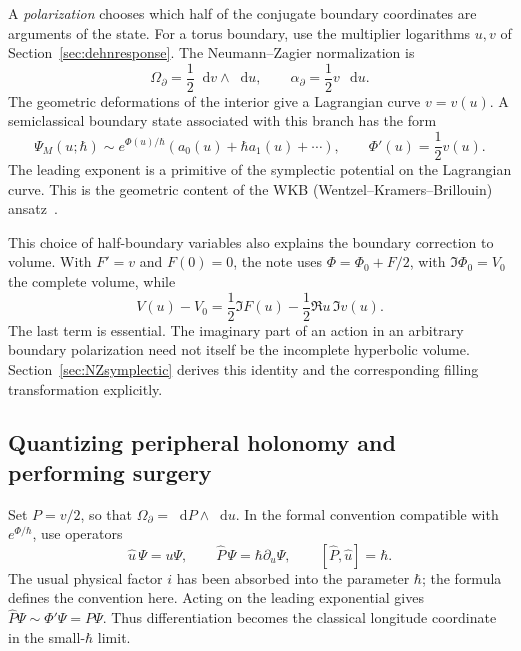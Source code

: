 \documentclass[11pt,a4paper]{article}
\numberwithin{equation}{section}
\theoremstyle{definition}
\theoremstyle{remark}
\newcommand{\dd}{\mathop{}\!\mathrm d}
\begin{document}
A \emph{polarization} chooses which half of the conjugate boundary
coordinates are arguments of the state. For a torus boundary,
use the multiplier logarithms $u,v$ of Section~\ref{sec:dehnresponse}.
The Neumann--Zagier normalization is
\begin{equation}
 \Omega_\partial=\frac12\dd v\wedge\dd u,
 \qquad \alpha_\partial=\frac12v\,\dd u.
 \label{eq:introNZpolarization}
\end{equation}
The geometric deformations of the interior give a Lagrangian curve
$v=v(u)$. A semiclassical boundary state associated with this
branch has the form
\begin{equation}
 \Psi_M(u;\hbar)\sim e^{\Phi(u)/\hbar}
       (a_0(u)+\hbar a_1(u)+\cdots),\qquad
 \Phi'(u)=\frac12v(u).
 \label{eq:introWKBstate}
\end{equation}
The leading exponent is a primitive of the symplectic potential
on the Lagrangian curve. This is the geometric content of the WKB
(Wentzel--Kramers--Brillouin) ansatz~\cite{DimofteQuantumRS}.

This choice of half-boundary variables also explains the boundary
correction to volume. With $F'=v$ and $F(0)=0$, the note uses
$\Phi=\Phi_0+F/2$, with $\Im\Phi_0=V_0$ the complete volume, while
\begin{equation}
 V(u)-V_0=\frac12\Im F(u)-\frac12\Re u\,\Im v(u).
 \label{eq:introvolumeboundary}
\end{equation}
The last term is essential. The imaginary part of an action in an
arbitrary boundary polarization need not itself be the incomplete
hyperbolic volume. Section~\ref{sec:NZsymplectic} derives this
identity and the corresponding filling transformation explicitly.

\subsection{Quantizing peripheral holonomy and performing surgery}
\label{sec:introquantization}

Set $P=v/2$, so that $\Omega_\partial=\dd P\wedge\dd u$.
In the formal convention compatible with
$e^{\Phi/\hbar}$, use operators
\begin{equation}
 \widehat u\,\Psi=u\Psi,\qquad
 \widehat P\,\Psi=\hbar\partial_u\Psi,
 \qquad [\widehat P,\widehat u]=\hbar.
 \label{eq:introcommutator}
\end{equation}
The usual physical factor $i$ has been absorbed into the parameter
$\hbar$; the formula defines the convention here. Acting on the
leading exponential gives $\widehat P\Psi\sim\Phi'\Psi=P\Psi$.
Thus differentiation becomes the classical longitude coordinate
in the small-$\hbar$ limit.
\end{document}
